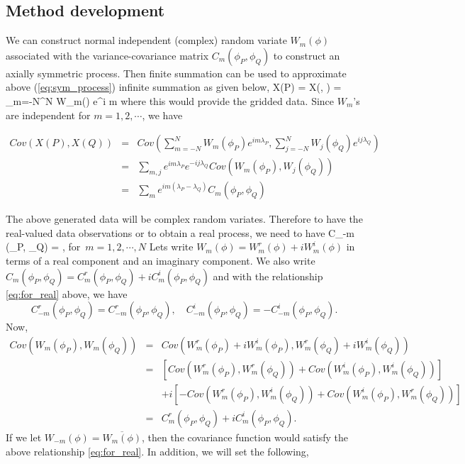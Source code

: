 	\subsection{Method development}
	
	
	We can construct normal independent (complex) random variate $W_m(\phi)$ associated with the variance-covariance matrix $C_m(\phi_P, \phi_Q)$ to construct an axially symmetric process. Then finite summation can be used to approximate above (\ref{eq:sym_process}) infinite summation as given below,
	\beq
	X(P) = X(\phi, \lambda) = \sum_{m=-N}^{N} W_m(\phi) e^{i m \lambda}
	\eeq
	where this would provide  the gridded data.
	Since $W_m$'s are independent for $m = 1, 2, \cdots$, we have
	
	\begin{eqnarray*}
		Cov(X(P), {X(Q)}) &=& Cov\left(\sum_{m = -N}^{N} W_m(\phi_P) e^{i m \lambda_P}, \sum_{j=-N}^{N} {W_j(\phi_Q)} e^{i j \lambda_Q}\right) \\
		&=& \sum_{m, j} e^{i m \lambda_P} e^{-i j \lambda_Q} Cov(W_m(\phi_P), {W_j(\phi_Q)}) \\
		&=& \sum_{m} e^{im (\lambda_P - \lambda_Q)} C_m(\phi_P, \phi_Q)
	\end{eqnarray*}
	
	The above generated data will be complex random variates. Therefore to have the real-valued data observations or to obtain a real process, we need to have
	\beq \label{eq:for_real}
	C_{-m} (\phi_P, \phi_Q) = , \quad \mbox{for $m = 1, 2, \cdots, N$}
	\eeq
	Lets write $W_m(\phi) = W_{m}^{r}(\phi) + i W_{m}^i(\phi)$ in terms of a real component and an imaginary component. We also write $C_m(\phi_P, \phi_Q) = C_m^r(\phi_P, \phi_Q) + i C_m^i(\phi_P, \phi_Q)$
	and with the relationship \ref{eq:for_real} above, we have
	\[
		C_{-m}^r(\phi_P, \phi_Q) = C_{-m}^r(\phi_P, \phi_Q), \quad C_{-m}^i(\phi_P, \phi_Q) = - C_{-m}^i(\phi_P, \phi_Q).
	\]
	Now,
	\begin{eqnarray*}
		Cov(W_m(\phi_P), {W_m(\phi_Q)}) &=& Cov(W_m^r(\phi_P) + iW_m^i(\phi_P), W_m^r(\phi_Q) + i W_m^i(\phi_Q)) \\
		&=& \left[Cov(W_m^r(\phi_P), W_m^r(\phi_Q)) + Cov(W_m^i(\phi_P), W_m^i(\phi_Q))\right] \\
		& & + i\left[- Cov(W_m^r(\phi_P), W_m^i(\phi_Q)) + Cov(W_m^i(\phi_P), W_m^r(\phi_Q))\right] \\
		&=& C_m^r(\phi_P, \phi_Q) + i C_m^i(\phi_P, \phi_Q).
	\end{eqnarray*}
	If we let $W_{-m}(\phi) = \overline{W_m(\phi)}$, then the covariance function would satisfy the above relationship \ref{eq:for_real}. In addition, we will set the following,
	
